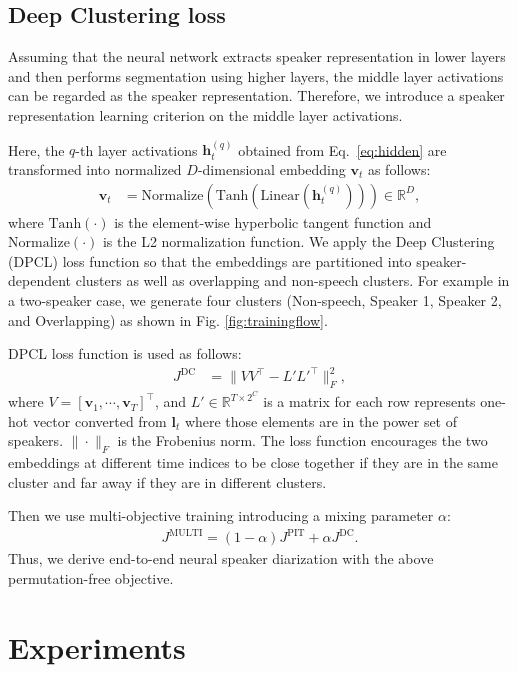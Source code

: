\documentclass[a4paper]{article}
\renewcommand{\v}[1]{\ensuremath{\mathbf{#1}}}
\begin{document}
\subsection{Deep Clustering loss}

Assuming that the neural network extracts speaker representation in lower layers and then performs segmentation using higher layers, the middle layer activations can be regarded as the speaker representation.
Therefore, we introduce a speaker representation learning criterion on the middle layer activations.

Here, the $q$-th layer activations $\v{h}^{(q)}_t$ obtained from Eq.~\ref{eq:hidden} are transformed into normalized  $D$-dimensional embedding $\v{v}_t$ as follows:
\begin{align}
    \v{v}_t &= \mathrm{Normalize}(\mathrm{Tanh}(\mathrm{Linear}(\v{h}^{(q)}_t))) \in \mathbb{R}^D \label{eq:dc3},
\end{align}
where $\mathrm{Tanh}(\cdot)$ is the element-wise hyperbolic tangent function and $\mathrm{Normalize}(\cdot)$ is the L2 normalization function.
We apply the Deep Clustering (DPCL) loss function \cite{Hershey2016} so that the embeddings are partitioned into speaker-dependent clusters as well as overlapping and non-speech clusters.
For example in a two-speaker case, we generate four clusters (Non-speech, Speaker 1, Speaker 2, and Overlapping) as shown in Fig. \ref{fig:trainingflow}.

DPCL loss function \cite{Hershey2016} is used as follows:
\begin{align}
    J^\text{DC} &= \|VV^\top - L'L'^\top\|_F^2,
\end{align}
where $V = [\v{v}_1,\cdots,\v{v}_T]^\top$, and $L' \in \mathbb{R}^{T \times 2^C}$ is a matrix for each row represents one-hot vector converted from $\v{l}_t$ where those elements are in the power set of speakers.
$\|\cdot\|_F$ is the Frobenius norm.
The loss function encourages the two embeddings at different time indices to be close together if they are in the same cluster and far away if they are in different clusters.

Then we use multi-objective training introducing a mixing parameter $\alpha$:
\begin{align}
    J^{\text{MULTI}} = (1 - \alpha) J^{\text{PIT}} + \alpha J^{\text{DC}}.
\end{align}
Thus, we derive end-to-end neural speaker diarization with the above permutation-free objective.

\section{Experiments}
\end{document}
